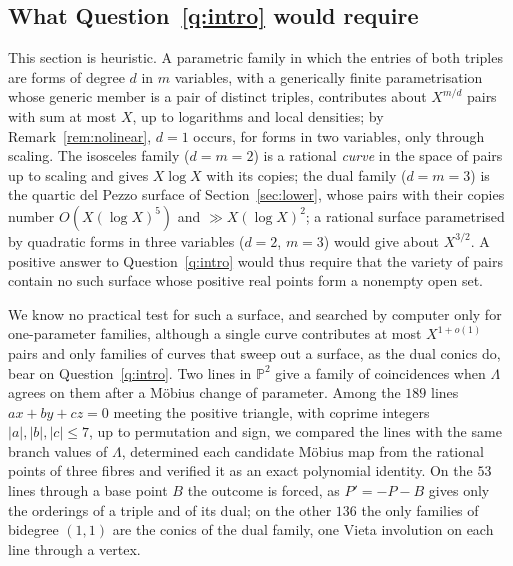\documentclass[11pt]{amsart}
\theoremstyle{definition}
\theoremstyle{remark}
\newcommand{\PP}{\mathbb{P}}
\begin{document}
\subsection{What Question~\ref{q:intro} would require}\label{sec:heuristic}

This section is heuristic. A parametric family in which the entries of both triples are forms of degree $d$ in $m$ variables, with a generically finite parametrisation whose generic member is a pair of distinct triples, contributes about $X^{m/d}$ pairs with sum at most $X$, up to logarithms and local densities; by Remark~\ref{rem:nolinear}, $d=1$ occurs, for forms in two variables, only through scaling. The isosceles family ($d=m=2$) is a rational \emph{curve} in the space of pairs up to scaling and gives $X\log X$ with its copies; the dual family ($d=m=3$) is the quartic del Pezzo surface of Section~\ref{sec:lower}, whose pairs with their copies number $O(X(\log X)^5)$ and $\gg X(\log X)^2$; a rational surface parametrised by quadratic forms in three variables ($d=2$, $m=3$) would give about $X^{3/2}$. A positive answer to Question~\ref{q:intro} would thus require that the variety of pairs contain no such surface whose positive real points form a nonempty open set.

We know no practical test for such a surface, and searched by computer only for one-parameter families, although a single curve contributes at most $X^{1+o(1)}$ pairs and only families of curves that sweep out a surface, as the dual conics do, bear on Question~\ref{q:intro}. Two lines in $\PP^2$ give a family of coincidences when $\Lambda$ agrees on them after a M\"obius change of parameter. Among the $189$ lines $ax+by+cz=0$ meeting the positive triangle, with coprime integers $|a|,|b|,|c|\le7$, up to permutation and sign, we compared the lines with the same branch values of $\Lambda$, determined each candidate M\"obius map from the rational points of three fibres and verified it as an exact polynomial identity. On the $53$ lines through a base point $B$ the outcome is forced, as $P'=-P-B$ gives only the orderings of a triple and of its dual; on the other $136$ the only families of bidegree $(1,1)$ are the conics of the dual family, one Vieta involution on each line through a vertex.
\end{document}
